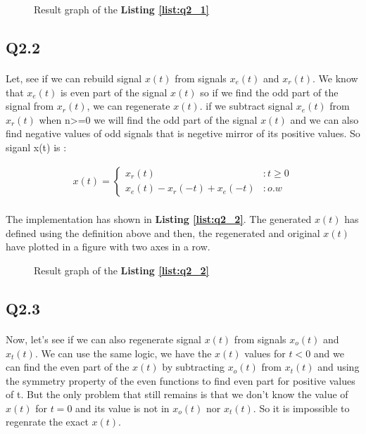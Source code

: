 
\begin{figure}[H]
  \centering
  \scalebox{0.4}{}
  \caption{Result graph of the \textbf{Listing \ref{list:q2_1}}}
  \label{fig:Q2_1}
\end{figure}

\subsection{Q2.2}
\paragraph{}Let, see if we can rebuild signal 
$x(t)$ from signals $x_e(t)$ and $x_r(t)$. We 
know that $x_e(t)$ is even part of the signal 
$x(t)$ so if we find the odd part of the signal 
from $x_r(t)$, we can regenerate $x(t)$. if we 
subtract signal $x_e(t)$ from $x_r(t)$ when n>=0 
we will find the odd part of the signal $x(t)$ and
 we can also find negative values of odd signals that is 
 negetive mirror of its positive values. So siganl x(t) is : 

 \begin{align}
  x(t) = \begin{cases}
  x_r(t) &: t \geq 0\\
  x_e(t) -x_r(-t)+x_e(-t)&: o.w\end{cases}
 \end{align}
\paragraph{}The implementation has shown 
in \textbf{Listing \ref{list:q2_2}}. The generated 
$x(t)$ has defined using the definition above and 
then, the regenerated and original $x(t)$ have 
plotted in a figure with two axes in a row.

\begin{figure}[H]
  \centering
  \scalebox{0.4}{}
  \caption{Result graph of the \textbf{Listing \ref{list:q2_2}}}
  \label{fig:Q2_2}
\end{figure}

\subsection{Q2.3}
\paragraph{}Now, let's see if we can also regenerate 
signal $x(t)$ from signals $x_o(t)$ and $x_t(t)$. We 
can use the same logic, we have the $x(t)$ values for 
$t<0$ and we can find the even part of the $x(t)$ 
by subtracting $x_o(t)$ from $x_t(t)$ and using the 
symmetry property of the even functions to find even 
part for positive values of t. But the only problem 
that still remains is that we don't know the value of 
$x(t)$ for $t=0$ and its value is not in $x_o(t)$ nor 
$x_t(t)$. So it is impossible to regenrate the exact 
$x(t)$.